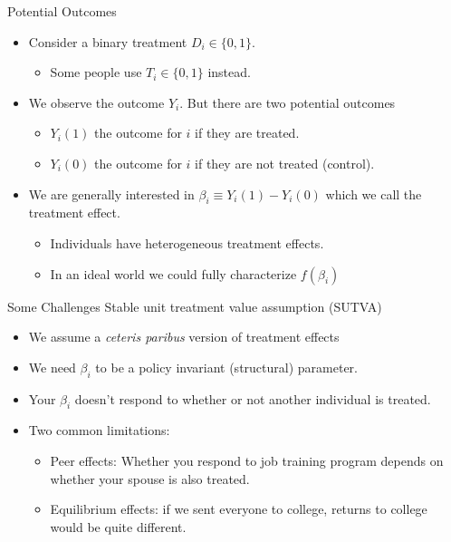 \documentclass[aspectratio=169,11pt]{beamer}
\begin{document}
\begin{frame}{Potential Outcomes}
\begin{itemize}
\item Consider a binary treatment $D_i \in \{0,1\}$. 
\begin{itemize}
\item Some people use $T_i \in \{0,1\}$ instead.
\end{itemize}
\item We observe the outcome $Y_i$. But there are two \alert{potential outcomes}
\begin{itemize}
\item $Y_i(1)$ the outcome for $i$ if they  \alert{are treated}.
\item $Y_i(0)$ the outcome for $i$ if they \alert{are not treated} (control).
\end{itemize}
\item We are generally interested in $\beta_i \equiv  Y_i(1)-Y_i(0)$ which we call the \alert{treatment effect}.
\begin{itemize}
\item Individuals have \alert{heterogeneous treatment effects}.
\item In an ideal world we could fully characterize $f(\beta_i)$
\end{itemize}
\end{itemize}
\end{frame}

\begin{frame}{Some Challenges}
Stable unit treatment value assumption (SUTVA)
\begin{itemize}
\item We assume a \textit{ceteris paribus} version of treatment effects
\item We need $\beta_i$ to be a policy invariant (structural) parameter.
\item Your $\beta_i$ doesn't respond to whether or not another individual is treated.
\item Two common limitations:
\begin{itemize}
\item Peer effects: Whether you respond to job training program depends on whether your spouse is also treated.
\item Equilibrium effects: if we sent everyone to college, returns to college would be quite different.
\end{itemize}
\end{itemize}
\end{frame}
\end{document}
